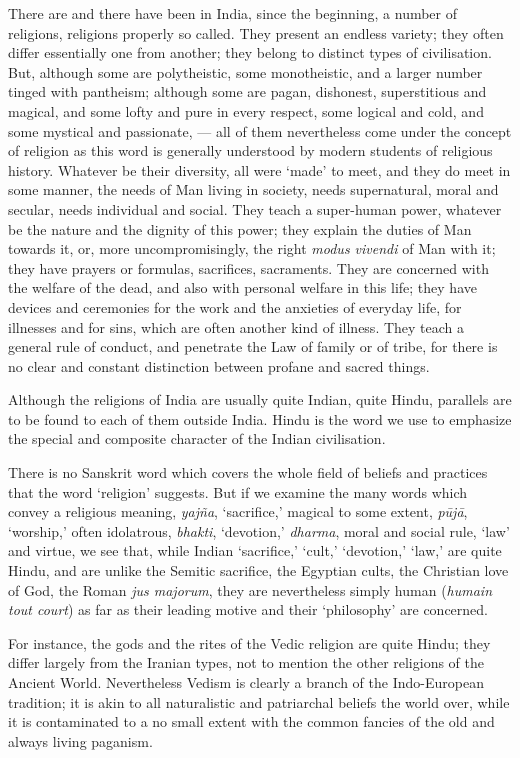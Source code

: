 \documentclass[a4paper, 11pt, oneside, english]{article}
\begin{document}
There are and there have been in India, since the beginning, a number of religions, religions properly so called. They present an endless variety; they often differ essentially one from another; they belong to distinct types of civilisation. But, although some are polytheistic, some monotheistic, and a larger number tinged with pantheism; although some are pagan, dishonest, superstitious and magical, and some lofty and pure in every respect, some logical and cold, and some mystical and passionate, --- all of them nevertheless come under the concept of religion as this word is generally understood by modern students of religious history. Whatever be their diversity, all were `made' to meet, and they do meet in some manner, the needs of Man living in society, needs supernatural, moral and secular, needs individual and social. They teach a super-human power, whatever be the nature and the dignity of this power; they explain the duties of Man towards it, or, more uncompromisingly, the right \emph{modus vivendi} of Man with it; they have prayers or formulas, sacrifices, sacraments. They are concerned with the welfare of the dead, and also with personal welfare in this life; they have devices and ceremonies for the work and the anxieties of everyday life, for illnesses and for sins, which are often another kind of illness. They teach a general rule of conduct, and penetrate the Law of family or of tribe, for there is no clear and constant distinction between profane and sacred things.

Although the religions of India are usually quite Indian, quite Hindu, parallels are to be found to each of them outside India. Hindu is the word we use to emphasize the special and composite character of the Indian civilisation.

There is no Sanskrit word which covers the whole field of beliefs and practices that the word `religion' suggests. But if we examine the many words which convey a religious meaning, \emph{yajña}, `sacrifice,' magical to some extent, \emph{pūjā}, `worship,' often idolatrous, \emph{bhakti}, `devotion,' \emph{dharma}, moral and social rule, `law' and virtue, we see that, while Indian `sacrifice,' `cult,' `devotion,' `law,' are quite Hindu, and are unlike the Semitic sacrifice, the Egyptian cults, the Christian love of God, the Roman \emph{jus majorum}, they are nevertheless simply human (\emph{humain tout court}) as far as their leading motive and their `philosophy' are concerned.

For instance, the gods and the rites of the Vedic religion are quite Hindu; they differ largely from the Iranian types, not to mention the other religions of the Ancient World. Nevertheless Vedism is clearly a branch of the Indo-European tradition; it is akin to all naturalistic and patriarchal beliefs the world over, while it is contaminated to a no small extent with the common fancies of the old and always living paganism.
\end{document}
